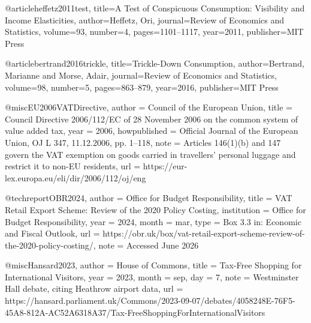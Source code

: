 @article{heffetz2011test,
  title={A Test of Conspicuous Consumption: Visibility and Income Elasticities},
  author={Heffetz, Ori},
  journal={Review of Economics and Statistics},
  volume={93},
  number={4},
  pages={1101--1117},
  year={2011},
  publisher={MIT Press}
}

@article{bertrand2016trickle,
  title={Trickle-Down Consumption},
  author={Bertrand, Marianne and Morse, Adair},
  journal={Review of Economics and Statistics},
  volume={98},
  number={5},
  pages={863--879},
  year={2016},
  publisher={MIT Press}
}

@misc{EU2006VATDirective,
  author       = {{Council of the European Union}},
  title        = {Council Directive 2006/112/{EC} of 28 {N}ovember 2006 on the common system of value added tax},
  year         = {2006},
  howpublished = {Official Journal of the European Union, OJ L 347, 11.12.2006, pp. 1--118},
  note         = {Articles 146(1)(b) and 147 govern the {VAT} exemption on goods carried in travellers' personal luggage and restrict it to non-{EU} residents},
  url          = {https://eur-lex.europa.eu/eli/dir/2006/112/oj/eng}
}

@techreport{OBR2024,
  author      = {{Office for Budget Responsibility}},
  title       = {{VAT Retail Export Scheme: Review of the 2020 Policy Costing}},
  institution = {Office for Budget Responsibility},
  year        = {2024},
  month       = mar,
  type        = {Box 3.3 in: Economic and Fiscal Outlook},
  url         = {https://obr.uk/box/vat-retail-export-scheme-review-of-the-2020-policy-costing/},
  note        = {Accessed June 2026}
}

@misc{Hansard2023,
  author = {{House of Commons}},
  title  = {Tax-Free Shopping for International Visitors},
  year   = {2023},
  month  = sep,
  day    = {7},
  note   = {Westminster Hall debate, citing Heathrow airport data},
  url    = {https://hansard.parliament.uk/Commons/2023-09-07/debates/4058248E-76F5-45A8-812A-AC52A6318A37/Tax-FreeShoppingForInternationalVisitors}
}

